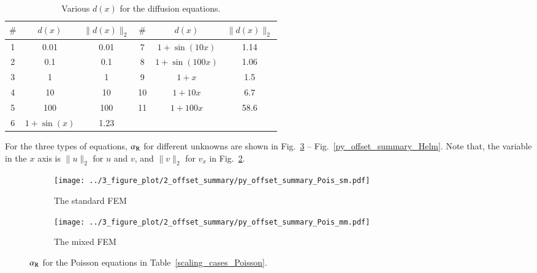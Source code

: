 \documentclass[review,3p]{elsarticle}
\begin{document}
\begin{table}[!ht]
\centering
\caption [w]{Various $d(x)$ for the diffusion equations.} 
\label{d_diffusion_equations}
 \begin{tabular}{c c c c c c} \hline
$\#$ &$d(x)$ & $\|d(x)\|_2$ & $\#$ &$d(x)$ & $\|d(x)\|_2$ \\ \hline
1 & 0.01 & 0.01 & 7 & $1+\sin(10x)$ & 1.14 \\ \hline
2 & 0.1 & 0.1 & 8 & $1+\sin(100x)$ & 1.06 \\ \hline
3 & 1 & 1 & 9 & $1+x$ & 1.5 \\ \hline
4 & 10 & 10 & 10 & $1+10x$ & 6.7 \\ \hline
5 & 100 & 100 & 11& $1+100x$ & 58.6 \\ \hline
6 & $1+\sin(x)$ & 1.23 & & &  \\ \hline
\end{tabular}
\end{table}


For the three types of equations, $\alpha_{\rm R}$ for different unknowns are shown in Fig.~\ref{py_offset_summary_Pois} -- Fig.~\ref{py_offset_summary_Helm}. Note that, the variable in the $x$ axis is $\|u\|_2$ for $u$ and $v$, and $\|v\|_2$ for $v_x$ in Fig.~\ref{py_offset_summary_Pois_mm}.

\begin{figure}[!ht]
	\centering
    \begin{subfigure}{6.0cm}
        \texttt{[image: ../3\_figure\_plot/2\_offset\_summary/py\_offset\_summary\_Pois\_sm.pdf]}
        \caption{The standard FEM}
        \label{py_offset_summary_Pois_sm}
    \end{subfigure}
    \hspace{-0.2cm}
    \begin{subfigure}{6.0cm}
        \texttt{[image: ../3\_figure\_plot/2\_offset\_summary/py\_offset\_summary\_Pois\_mm.pdf]}
        \caption{The mixed FEM}
        \label{py_offset_summary_Pois_mm}
    \end{subfigure}
\caption{$\alpha_{\rm R}$ for the Poisson equations in Table~\ref{scaling_cases_Poisson}.}
\label{py_offset_summary_Pois}
\end{figure}
\end{document}
